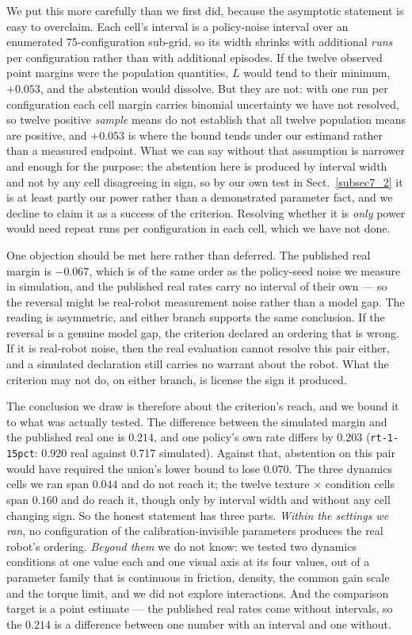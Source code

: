\documentclass[pdflatex,iicol,sn-apa]{sn-jnl}
\theoremstyle{remark}
\begin{document}
We put this more carefully than we first did, because the asymptotic statement is easy to overclaim.
Each cell's interval is a policy-noise interval over an enumerated 75-configuration sub-grid, so its
width shrinks with additional \emph{runs} per configuration rather than with additional episodes. If
the twelve observed point margins were the population quantities, $L$ would tend to their minimum,
$+0.053$, and the abstention would dissolve. But they are not: with one run per configuration each
cell margin carries binomial uncertainty we have not resolved, so twelve positive \emph{sample}
means do not establish that all twelve population means are positive, and $+0.053$ is where the
bound tends under our estimand rather than a measured endpoint. What we can say without that
assumption is narrower and enough for the purpose: the abstention here is produced by interval width
and not by any cell disagreeing in sign, so by our own test in Sect.~\ref{subsec7_2} it is at least
partly our power rather than a demonstrated parameter fact, and we decline to claim it as a success
of the criterion. Resolving whether it is \emph{only} power would need repeat runs per configuration
in each cell, which we have not done.

One objection should be met here rather than deferred. The published real margin is $-0.067$,
which is of the same order as the policy-seed noise we measure in simulation, and the published
real rates carry no interval of their own --- so the reversal might be real-robot measurement noise
rather than a model gap. The reading is asymmetric, and either branch supports the same conclusion.
If the reversal is a genuine model gap, the criterion declared an ordering that is wrong. If it is
real-robot noise, then the real evaluation cannot resolve this pair either, and a simulated
declaration still carries no warrant about the robot. What the criterion may not do, on either
branch, is license the sign it produced.

The conclusion we draw is therefore about the criterion's reach, and we bound it to what was
actually tested. The difference between the simulated margin and the published real one is $0.214$,
and one policy's own rate differs by $0.203$ (\texttt{rt-1-15pct}: 0.920 real against 0.717
simulated). Against that, abstention on this pair would have required the union's lower bound to
lose $0.070$. The three dynamics cells we ran span $0.044$ and do not reach it; the twelve
texture $\times$ condition cells span $0.160$ and do reach it, though only by interval width and
without any cell changing sign. So the honest statement has three parts. \emph{Within the settings
we ran}, no configuration of the calibration-invisible parameters produces the real robot's
ordering. \emph{Beyond them} we do not know: we tested two dynamics conditions at one value each and
one visual axis at its four values, out of a parameter family that is continuous in friction,
density, the common gain scale and the torque limit, and we did not explore interactions. And the
comparison target is a point estimate --- the published real rates come without intervals, so the
$0.214$ is a difference between one number with an interval and one without.
\end{document}
